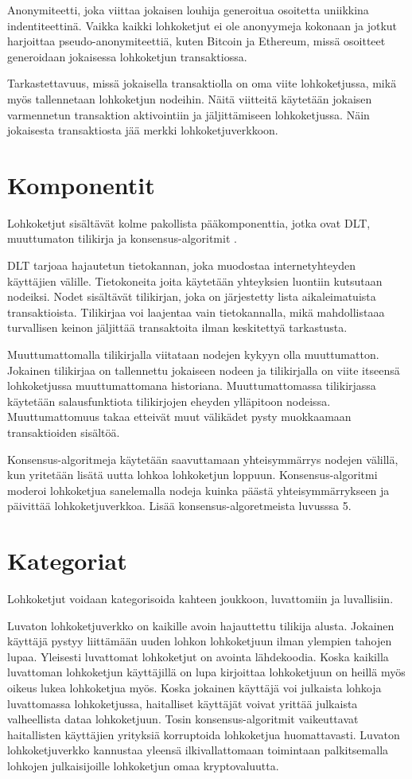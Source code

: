 \documentclass[utf8,bachelor]{gradu3}
\begin{document}
Anonymiteetti, joka viittaa jokaisen louhija generoitua osoitetta uniikkina indentiteettinä.
Vaikka kaikki lohkoketjut ei ole anonyymeja kokonaan ja jotkut harjoittaa pseudo-anonymiteettiä, kuten Bitcoin ja Ethereum, missä osoitteet generoidaan jokaisessa lohkoketjun transaktiossa. 

Tarkastettavuus, missä jokaisella transaktiolla on oma viite lohkoketjussa, mikä myös tallennetaan lohkoketjun nodeihin. Näitä viitteitä käytetään jokaisen varmennetun transaktion aktivointiin ja jäljittämiseen lohkoketjussa. Näin jokaisesta transaktiosta jää merkki lohkoketjuverkkoon.

\section{Komponentit}
Lohkoketjut sisältävät kolme pakollista pääkomponenttia, jotka ovat DLT, muuttumaton tilikirja ja konsensus-algoritmit \parencite{zarrin2021blockchain}.

DLT tarjoaa hajautetun tietokannan, joka muodostaa internetyhteyden käyttäjien välille. Tietokoneita joita käytetään yhteyksien luontiin kutsutaan nodeiksi.
Nodet sisältävät tilikirjan, joka on järjestetty lista aikaleimatuista transaktioista.
Tilikirjaa voi laajentaa vain tietokannalla, mikä mahdollistaaa turvallisen keinon jäljittää transaktoita ilman keskitettyä tarkastusta.

Muuttumattomalla tilikirjalla viitataan nodejen kykyyn olla muuttumatton.
Jokainen tilikirjaa on tallennettu jokaiseen nodeen ja tilikirjalla on viite itseensä lohkoketjussa muuttumattomana historiana.
Muuttumattomassa tilikirjassa käytetään salausfunktiota tilikirjojen eheyden ylläpitoon nodeissa.
Muuttumattomuus takaa etteivät muut välikädet pysty muokkaamaan transaktioiden sisältöä.

Konsensus-algoritmeja käytetään saavuttamaan yhteisymmärrys nodejen välillä, kun yritetään lisätä uutta lohkoa lohkoketjun loppuun.
Konsensus-algoritmi moderoi lohkoketjua sanelemalla nodeja kuinka päästä yhteisymmärrykseen ja päivittää lohkoketjuverkkoa. Lisää konsensus-algoretmeista luvusssa 5. 

\section{Kategoriat}
Lohkoketjut voidaan kategorisoida kahteen joukkoon, luvattomiin ja luvallisiin.

Luvaton lohkoketjuverkko on kaikille avoin hajauttettu tilikija alusta. 
Jokainen käyttäjä pystyy liittämään uuden lohkon lohkoketjuun ilman ylempien tahojen lupaa. Yleisesti luvattomat lohkoketjut on avointa lähdekoodia.
Koska kaikilla luvattoman lohkoketjun käyttäjillä on lupa kirjoittaa lohkoketjuun on heillä myös oikeus lukea lohkoketjua myös.
Koska jokainen käyttäjä voi julkaista lohkoja luvattomassa lohkoketjussa, haitalliset käyttäjät voivat yrittää julkaista valheellista dataa lohkoketjuun.
Tosin konsensus-algoritmit vaikeuttavat haitallisten käyttäjien yrityksiä korruptoida lohkoketjua huomattavasti.
Luvaton lohkoketjuverkko kannustaa yleensä ilkivallattomaan toimintaan palkitsemalla lohkojen julkaisijoille lohkoketjun omaa kryptovaluutta.
\end{document}
